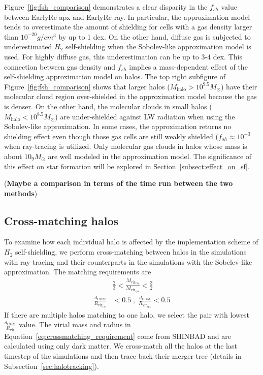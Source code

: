 \documentclass[linenumbers, twocolumn]{aastex631}
\begin{document}
Figure~\ref{fig:fsh_comparison} demonstrates a clear disparity in the $f_{sh}$ value between EarlyRe-apx and EarlyRe-ray. In particular, the approximation model tends to overestimate the amount of shielding for cells with a gas density larger than $10^{-20} g/cm^3$ by up to 1 dex. On the other hand, diffuse gas is subjected to underestimated $H_{2}$ self-shielding when the Sobolev-like approximation model is used. For highly diffuse gas, this underestimation can be up to 3-4 dex. This connection between gas density and $f_{sh}$ implies a mass-dependent effect of the self-shielding approximation model on halos. The top right subfigure of Figure~\ref{fig:fsh_comparison} shows that larger halos ($M_{\text{halo}} > 10^{9.5} M_{\odot}$) have their molecular cloud region over-shielded in the approximation model because the gas is denser. On the other hand, the molecular clouds in small halos ($M_{\text{halo}} < 10^{8.5} M_{\odot}$) are under-shielded against LW radiation when using the Sobolev-like approximation. In some cases, the approximation returns no shielding effect even though those gas cells are still weakly shielded ($f_{sh} \approx 10^{-3}$ when ray-tracing is utilized. Only molecular gas clouds in halos whose mass is about $10_{9} M_\odot$ are well modeled in the approximation model. The significance of this effect on star formation will be explored in Section~\ref{subsect:effect_on_sf}.

(\textbf{Maybe a comparison in terms of the time run between the two methods})

\subsection{Cross-matching halos}
\label{subsect:cross-matching_halos}
To examine how each individual halo is affected by the implementation scheme of $H_{2}$ self-shielding, we perform cross-matching between halos in the simulations with ray-tracing and their counterparts in the simulations with the Sobelev-like approximation. The matching requirements are
\begin{align}
    & \frac{2}{3} < \frac{M_{\mathrm{vir}_{\mathrm{ray}}}}{M_{\mathrm{vir}_{\mathrm{apx}}}} < \frac{3}{2} \nonumber \\
    \frac{d_{\text{COM}}}{R_{\mathrm{vir}_{\mathrm{ray}}}} & < 0.5 \; , \; \frac{d_{\text{COM}}}{R_{\mathrm{vir}_{\mathrm{apx}}}} < 0.5 
\label{eq:crossmatching_requirement}
\end{align}
If there are multiple halos matching to one halo, we select the pair with lowest $\frac{d_{\text{COM}}}{R_{\mathrm{vir}}}$ value. The virial mass and radius in Equation~\ref{eq:crossmatching_requirement} come from SHINBAD and are calculated using only dark matter. We cross-match all the halos at the last timestep of the simulations and then trace back their merger tree (details in Subsection~\ref{sec:halotracking}).
\end{document}
